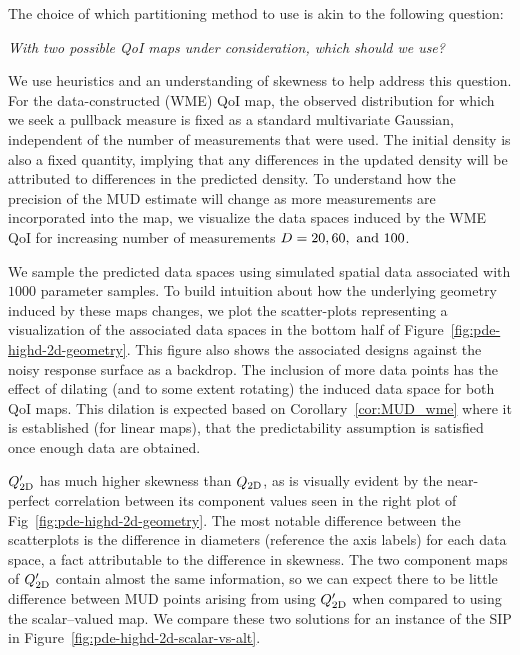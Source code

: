 The choice of which partitioning method to use is akin to the following question:
\begin{center}
\emph{With two possible QoI maps under consideration, which should we use?}
\end{center}

We use heuristics and an understanding of skewness to help address this question.
For the data-constructed (WME) QoI map, the observed distribution for which we seek a pullback measure is fixed as a standard multivariate Gaussian, independent of the number of measurements that were used.
The initial density is also a fixed quantity, implying that any differences in the updated density will be attributed to differences in the predicted density.
To understand how the precision of the MUD estimate will change as more measurements are incorporated into the map, we visualize the data spaces induced by the WME QoI for increasing number of measurements $D = 20, 60, \text{ and } 100$.

We sample the predicted data spaces using simulated spatial data associated with $1000$ parameter samples.
To build intuition about how the underlying geometry induced by these maps changes, we plot the scatter-plots representing a visualization of the associated data spaces in the bottom half of Figure~\ref{fig:pde-highd-2d-geometry}.
This figure also shows the associated designs against the noisy response surface as a backdrop.
The inclusion of more data points has the effect of dilating (and to some extent rotating) the induced data space for both QoI maps.
This dilation is expected based on Corollary~\ref{cor:MUD_wme} where it is established (for linear maps), that the predictability assumption is satisfied once enough data are obtained.

$Q_\text{2D}^\prime$ has much higher skewness than $Q_\text{2D}$, as is visually evident by the near-perfect correlation between its component values seen in the right plot of Fig~\ref{fig:pde-highd-2d-geometry}.
The most notable difference between the scatterplots is the difference in diameters (reference the axis labels) for each data space, a fact attributable to the difference in skewness.
The two component maps of $Q_\text{2D}^\prime$ contain almost the same information, so we can expect there to be little difference between MUD points arising from using $Q_\text{2D}^\prime$ when compared to using the scalar--valued map.
We compare these two solutions for an instance of the SIP in Figure~\ref{fig:pde-highd-2d-scalar-vs-alt}.

